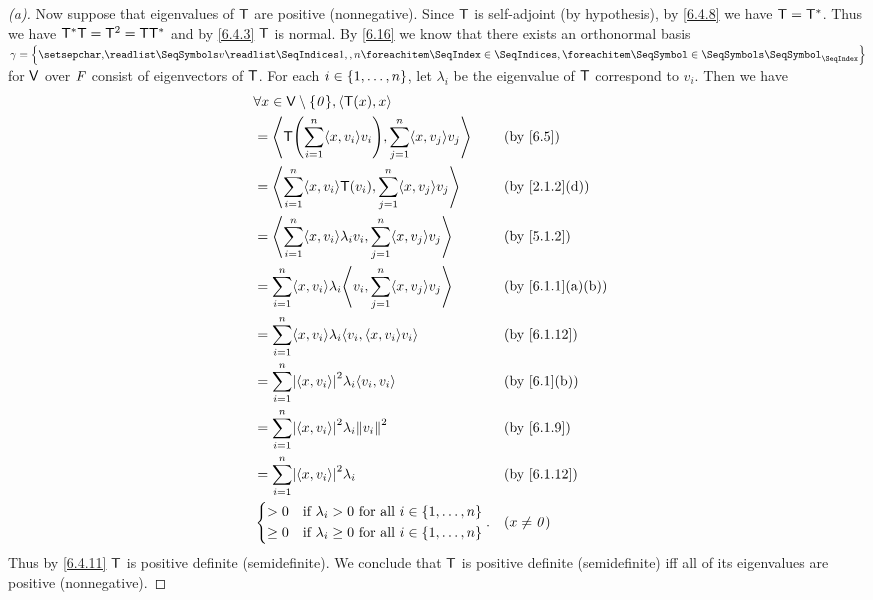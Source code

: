 \begin{proof}[(a)]
  Now suppose that eigenvalues of \(\mathsf{T}\) are positive (nonnegative).
  Since \(\mathsf{T}\) is self-adjoint (by hypothesis), by \cref{6.4.8} we have \(\mathsf{T} = \mathsf{T}^*\).
  Thus we have \(\mathsf{T}^* \mathsf{T} = \mathsf{T}^2 = \mathsf{T} \mathsf{T}^*\) and by \cref{6.4.3} \(\mathsf{T}\) is normal.
  By \cref{6.16} we know that there exists an orthonormal basis \(\gamma = \set{\seq{v}{1,,n}}\) for \(\mathsf{V}\) over \(\mathit{F}\) consist of eigenvectors of \(\mathsf{T}\).
  For each \(i \in \left\lbrace1, \dots, n\right\rbrace\), let \(\lambda_i\) be the eigenvalue of \(\mathsf{T}\) correspond to \(v_i\).
  Then we have
  \begin{align*}
     & \forall x \in \V \setminus \set{\zv}, \inn{\T(x), x}                                                                   \\
     & = \inn{\T\pa{\sum_{i = 1}^n \inn{x, v_i} v_i}, \sum_{j = 1}^n \inn{x, v_j} v_j}    &  & \text{(by \cref{6.5})}         \\
     & = \inn{\sum_{i = 1}^n \inn{x, v_i} \T(v_i), \sum_{j = 1}^n \inn{x, v_j} v_j}       &  & \text{(by \cref{2.1.2}(d))}    \\
     & = \inn{\sum_{i = 1}^n \inn{x, v_i} \lambda_i v_i, \sum_{j = 1}^n \inn{x, v_j} v_j} &  & \text{(by \cref{5.1.2})}       \\
     & = \sum_{i = 1}^n \inn{x, v_i} \lambda_i \inn{v_i, \sum_{j = 1}^n \inn{x, v_j} v_j} &  & \text{(by \cref{6.1.1}(a)(b))} \\
     & = \sum_{i = 1}^n \inn{x, v_i} \lambda_i \inn{v_i, \inn{x, v_i} v_i}                &  & \text{(by \cref{6.1.12})}      \\
     & = \sum_{i = 1}^n \abs{\inn{x, v_i}}^2 \lambda_i \inn{v_i, v_i}                     &  & \text{(by \cref{6.1}(b))}      \\
     & = \sum_{i = 1}^n \abs{\inn{x, v_i}}^2 \lambda_i \norm{v_i}^2                       &  & \text{(by \cref{6.1.9})}       \\
     & = \sum_{i = 1}^n \abs{\inn{x, v_i}}^2 \lambda_i                                    &  & \text{(by \cref{6.1.12})}      \\
     & \begin{dcases}
         > 0    & \text{if } \lambda_i > 0 \text{ for all } i \in \set{1, \dots, n}    \\
         \geq 0 & \text{if } \lambda_i \geq 0 \text{ for all } i \in \set{1, \dots, n}
       \end{dcases}.   &  & (x \neq \zv)
  \end{align*}
  Thus by \cref{6.4.11} \(\mathsf{T}\) is positive definite (semidefinite).
  We conclude that \(\mathsf{T}\) is positive definite (semidefinite) iff all of its eigenvalues are positive (nonnegative).
\end{proof}

